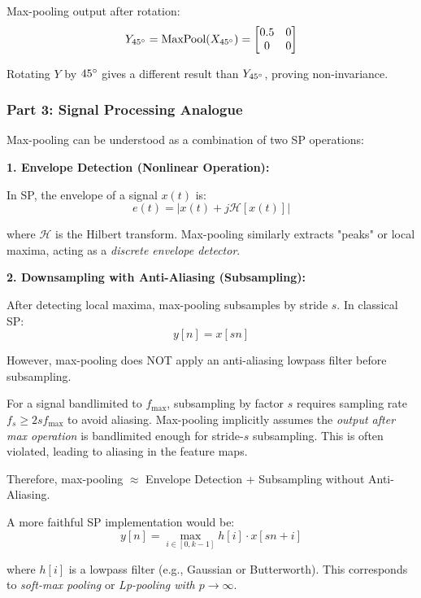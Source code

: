 \documentclass[12pt]{article}
\begin{document}
Max-pooling output after rotation:
$$
Y_{45\degree} = \text{MaxPool}(X_{45\degree}) = \begin{bmatrix}
0.5 & 0 \\
0 & 0
\end{bmatrix}
$$

Rotating $Y$ by $45\degree$ gives a different result than $Y_{45\degree}$, proving non-invariance.


\subsubsection*{Part 3: Signal Processing Analogue}

Max-pooling can be understood as a combination of two SP operations:

\textbf{1. Envelope Detection (Nonlinear Operation):}

In SP, the envelope of a signal $x(t)$ is:
$$
e(t) = |x(t) + j\mathcal{H}[x(t)]|
$$

where $\mathcal{H}$ is the Hilbert transform. Max-pooling similarly extracts "peaks" or local maxima, acting as a \textit{discrete envelope detector}.

\textbf{2. Downsampling with Anti-Aliasing (Subsampling):}

After detecting local maxima, max-pooling subsamples by stride $s$. In classical SP:
$$
y[n] = x[sn]
$$

However, max-pooling does NOT apply an anti-aliasing lowpass filter before subsampling.


For a signal bandlimited to $f_{\max}$, subsampling by factor $s$ requires sampling rate $f_s \geq 2sf_{\max}$ to avoid aliasing. Max-pooling implicitly assumes the \textit{output after max operation} is bandlimited enough for stride-$s$ subsampling. This is often violated, leading to aliasing in the feature maps.

Therefore, max-pooling $\approx$ Envelope Detection + Subsampling without Anti-Aliasing.

A more faithful SP implementation would be:
$$
y[n] = \max_{i \in [0, k-1]} h[i] \cdot x[sn + i]
$$

where $h[i]$ is a lowpass filter (e.g., Gaussian or Butterworth). This corresponds to \textit{soft-max pooling} or \textit{Lp-pooling with $p \to \infty$}.
\end{document}
